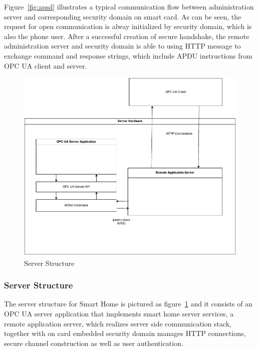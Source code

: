 \documentclass[]{llncs}
\begin{document}
Figure~\ref{fig:apsd} illustrates a typical communication flow between administration server and corresponding security domain on smart card. As can be seen, the request for open communication is alway initialized by security domain, which is also the phone user. After a successful creation of secure handshake, the remote administration server and security domain is able to using HTTP message to exchange command and response strings, which include APDU instructions from OPC UA client and server.

\begin{figure}
	\centering
	\includegraphics[width=1.0\textwidth]{serverStructure}
		\caption[ ]{Server Structure}
	\label{fig:serverStructure}
\end{figure}
\subsubsection{Server Structure}
The server structure for Smart Home is pictured as figure~\ref{fig:serverStructure} and it consists of an OPC UA server application that implements smart home server services, a remote application server, which realizes server side communication stack, together with on card embedded security domain manages HTTP connections, secure channel construction as well as user authentication. 





\end{document}
